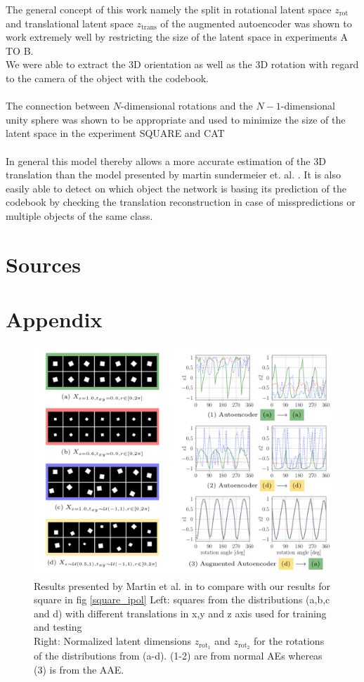 \documentclass[10pt,a4paper]{article}
\newcommand{\rot}{\ensuremath{\text{rot}\xspace}}
\newcommand{\trans}{\ensuremath{\text{trans}\xspace}}
\begin{document}
The general concept of this work namely the split in rotational latent space $z_{\rot}$ and translational latent space $z_{\trans}$ of the augmented autoencoder was shown to work  extremely well by restricting the size of the latent space in experiments A TO B.\\
We were able to extract the 3D orientation as well as the 3D rotation with regard to the camera of the object with the codebook.\\
\\
The connection between $N$-dimensional rotations and the $N-1$-dimensional unity sphere was shown to be appropriate and used to minimize the size of the latent space in the experiment SQUARE and CAT\\
\\
In general this model thereby allows a more accurate estimation of the 3D translation than the model presented by martin sundermeier et. al. .
It is also easily able to detect on which object the network is basing its prediction of the codebook by checking the translation reconstruction in case of misspredictions or multiple objects of the same class.\\


\newpage
\section{Sources}\label{Sources}
\printbibliography

\newpage
\section{Appendix}
\begin{figure}
    \center
    \includegraphics[width = \linewidth]{MARTIN_Squares.png}
    \caption{Results presented by Martin et al. in \cite{3D_Orientation_Learning} to compare with our results for square in fig \ref{square_ipol}
        Left: squares from the distributions (a,b,c and d) with different translations in x,y and z axis used for training and testing\\
    Right: Normalized latent dimensions $z_{\rot_1}$ and $z_{\rot_2}$ for the rotations of the distributions from (a-d). (1-2) are from normal AEs whereas (3) is from the AAE.}\label{SQUARE_Martin}
\end{figure}
\end{document}
